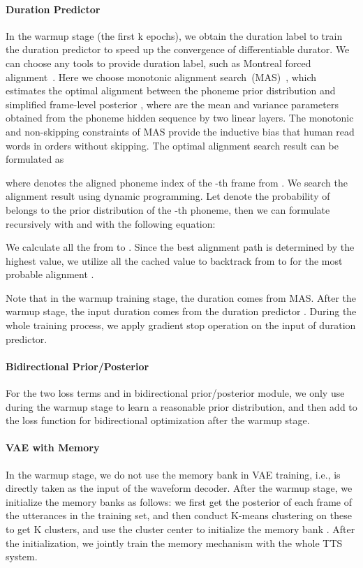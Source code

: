 \documentclass{article}
\theoremstyle{definition}
\begin{document}
\paragraph{Duration Predictor}
In the warmup stage (the first k epochs), we obtain the duration label to train the duration predictor to speed up the convergence of differentiable durator. We can choose any tools to provide duration label, such as Montreal forced alignment~\citep{mcauliffe2017montreal}. Here we choose monotonic alignment search~(MAS)~\cite{kim2020glow}, which estimates the optimal alignment between the phoneme prior distribution  and simplified frame-level posterior , where  are the mean and variance parameters obtained from the phoneme hidden sequence by two linear layers. The monotonic and non-skipping constraints of MAS provide the inductive bias that human read words in orders without skipping. The optimal alignment search result  can be formulated as

where  denotes the aligned phoneme index of the -th frame  from . 
We search the alignment result using dynamic programming. Let  denote the probability of  belongs to the prior distribution of the -th phoneme, then we can formulate  recursively with  and  with the following equation:


We calculate all the  from  to . Since the best alignment path is determined by the highest  value, we utilize all the cached  value to backtrack from  to  for the most probable alignment .

Note that in the warmup training stage, the duration  comes from MAS. After the warmup stage, the input duration comes from the duration predictor . During the whole training process, we apply gradient stop operation on the input of duration predictor.

\paragraph{Bidirectional Prior/Posterior}
For the two loss terms  and  in bidirectional prior/posterior module, we only use  during the warmup stage to learn a reasonable prior distribution, and then add  to the loss function for bidirectional optimization after the warmup stage.

\paragraph{VAE with Memory}
In the warmup stage, we do not use the memory bank in VAE training, i.e.,  is directly taken as the input of the waveform decoder. After the warmup stage, we initialize the memory banks  as follows: we first get the posterior  of each frame of the utterances in the training set, and then conduct K-means clustering on these  to get K clusters, and use the cluster center to initialize the memory bank . After the initialization, we jointly train the memory mechanism with the whole TTS system.
\end{document}
